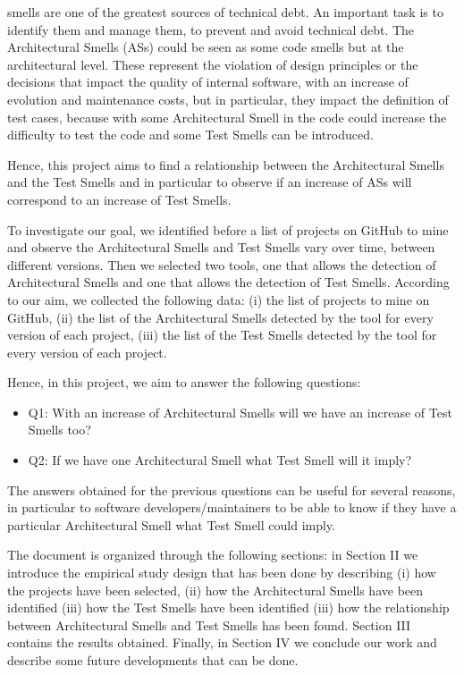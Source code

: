 
 smells are one of the greatest sources of technical debt. An important task is to identify them and manage them, to prevent and avoid technical debt. The Architectural Smells (ASs) could be seen as some code smells but at the architectural level. These represent the violation of design principles or the decisions that impact the quality of internal software, with an increase of evolution and maintenance costs, but in particular, they impact the definition of test cases, because with some Architectural Smell in the code could increase the difficulty to test the code and some Test Smells can be introduced.\par\hfill

Hence, this project aims to find a relationship between the Architectural Smells and the Test Smells and in particular to observe if an increase of ASs will correspond to an increase of Test Smells.\par\hfill

To investigate our goal, we identified before a list of projects on GitHub to mine and observe the Architectural Smells and Test Smells vary over time, between different versions. Then we selected two tools, one that allows the detection of Architectural Smells and one that allows the detection of Test Smells.
According to our aim, we collected the following data: 
(i) the list of projects to mine on GitHub,
(ii) the list of the Architectural Smells detected by the tool for every version of each project, 
(iii) the list of the Test Smells detected by the tool for every version of each project.\par\hfill

Hence, in this project, we aim to answer the following questions:
\begin{itemize}
  \item Q1: With an increase of Architectural Smells will we have an increase of Test Smells too? 
  \item Q2: If we have one Architectural Smell what Test Smell will it imply?
\end{itemize}\par\hfill

The answers obtained for the previous questions can be useful for several reasons, in particular to software developers/maintainers to be able to know if they have a particular Architectural Smell what Test Smell could imply.\par\hfill

The document is organized through the following sections: in Section II we introduce the empirical study design that has been done by describing (i) how the projects have been selected, (ii) how the Architectural Smells have been identified (iii) how the Test Smells have been identified (iii) how the relationship between Architectural Smells and Test Smells has been found. Section III contains the results obtained. Finally, in Section IV we conclude our work and describe some future developments that can be done.